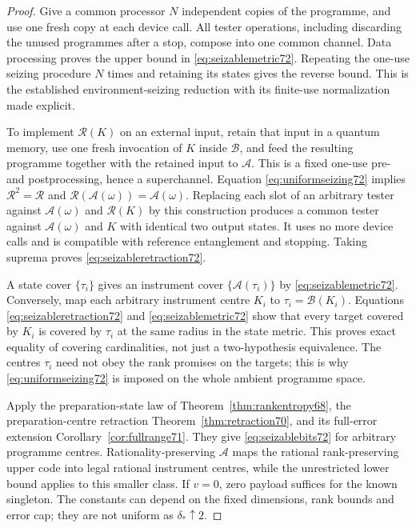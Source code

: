 \begin{proof}
Give a common processor $N$ independent copies of the programme,
and use one fresh copy at each device call. All tester operations,
including discarding the unused programmes after a stop, compose into
one common channel. Data processing proves the upper bound in
\eqref{eq:seizablemetric72}. Repeating the one-use seizing procedure
$N$ times and retaining its states gives the reverse bound. This is
the established environment-seizing reduction with its finite-use
normalization made explicit.

To implement $\mathcal R(K)$ on an external input, retain that input
in a quantum memory, use one fresh invocation of $K$ inside
$\mathcal B$, and feed the resulting programme together with the
retained input to $\mathcal A$. This is a fixed one-use pre- and
postprocessing, hence a superchannel. Equation
\eqref{eq:uniformseizing72} implies $\mathcal R^2=\mathcal R$ and
$\mathcal R(\mathcal A(\omega))=\mathcal A(\omega)$.
Replacing each slot of an arbitrary tester against
$\mathcal A(\omega)$ and $\mathcal R(K)$ by this construction
produces a common tester against $\mathcal A(\omega)$ and $K$ with
identical two output states. It uses no more device calls and is
compatible with reference entanglement and stopping. Taking suprema
proves \eqref{eq:seizableretraction72}.

A state cover $\{\tau_i\}$ gives an instrument cover
$\{\mathcal A(\tau_i)\}$ by \eqref{eq:seizablemetric72}.
Conversely, map each arbitrary instrument centre $K_i$ to
$\tau_i=\mathcal B(K_i)$. Equations
\eqref{eq:seizableretraction72} and \eqref{eq:seizablemetric72}
show that every target covered by $K_i$ is covered by $\tau_i$ at
the same radius in the state metric. This proves exact equality of
covering cardinalities, not just a two-hypothesis equivalence.
The centres $\tau_i$ need not obey the rank promises on the targets;
this is why \eqref{eq:uniformseizing72} is imposed on the whole
ambient programme space.

Apply the preparation-state law of
Theorem~\ref{thm:rankentropy68}, the preparation-centre retraction
Theorem~\ref{thm:retraction70}, and its full-error extension
Corollary~\ref{cor:fullrange71}. They give \eqref{eq:seizablebits72}
for arbitrary programme centres. Rationality-preserving $\mathcal A$
maps the rational rank-preserving upper code into legal rational
instrument centres, while the unrestricted lower bound applies to
this smaller class. If $v=0$, zero payload suffices for the known
singleton. The constants can depend on the fixed dimensions, rank
bounds and error cap; they are not uniform as $\delta_*\uparrow2$.
\end{proof}

